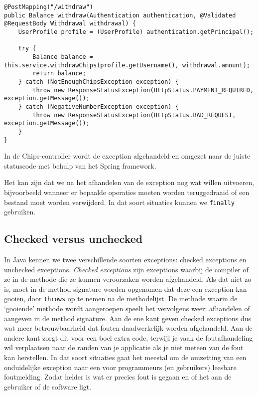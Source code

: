 \begin{listing}[H]
\begin{verbatim}
@PostMapping("/withdraw")
public Balance withdraw(Authentication authentication, @Validated @RequestBody Withdrawal withdrawal) {
    UserProfile profile = (UserProfile) authentication.getPrincipal();

    try {
        Balance balance = this.service.withdrawChips(profile.getUsername(), withdrawal.amount);
        return balance;
    } catch (NotEnoughChipsException exception) {
        throw new ResponseStatusException(HttpStatus.PAYMENT_REQUIRED, exception.getMessage());
    } catch (NegativeNumberException exception) {
        throw new ResponseStatusException(HttpStatus.BAD_REQUEST, exception.getMessage());
    }
}
\end{verbatim}
\caption{In de Chips-controller wordt de exception afgehandeld 
en omgezet naar de juiste statuscode met behulp van het Spring framework.}
\label{code:chips-throw}
\end{listing}

Het kan zijn dat we na het afhandelen van de exception nog wat willen uitvoeren,
bijvoorbeeld wanneer er bepaalde operaties moeten worden teruggedraaid of een bestand 
moet worden verwijderd. In dat soort situaties kunnen we \texttt{finally} gebruiken.

\subsection{Checked versus unchecked}
In Java kennen we twee verschillende soorten exceptions: 
checked exceptions en unchecked exceptions.
\textit{Checked exceptions} zijn exceptions waarbij de compiler 
 of ze in de methode die ze kunnen veroorzaken worden afgehandeld.
Als dat niet zo is, moet in de method signature worden opgenomen dat deze 
een exception kan gooien, door \texttt{throws} op te nemen na de methodelijst.
De methode waarin de `gooiende' methode wordt aangeroepen speelt het vervolgens weer:
afhandelen of aangeven in de method signature. Aan de ene kant geven checked exceptions 
dus wat meer betrouwbaarheid dat fouten daadwerkelijk worden afgehandeld. Aan de andere kant 
zorgt dit voor een boel extra code, terwijl je vaak de foutafhandeling wil verplaatsen 
naar de randen van je applicatie als je niet meteen van de fout kan herstellen. 
In dat soort situaties gaat het meestal om de omzetting van een onduidelijke exception 
naar een voor programmeurs (en gebruikers) leesbare foutmelding. Zodat helder is 
wat er precies fout is gegaan en of het aan de gebruiker of de software ligt.

